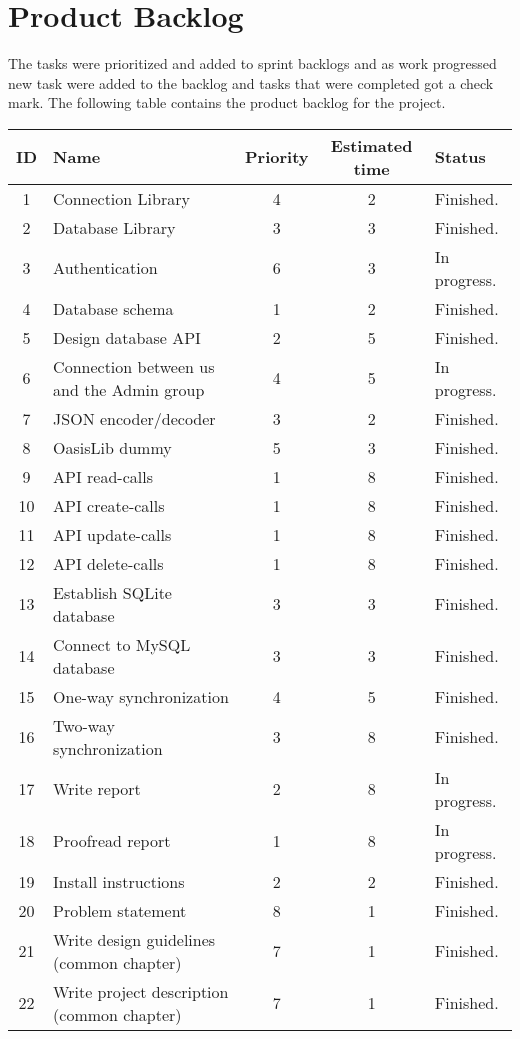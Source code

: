\section{Product Backlog}
The tasks were prioritized and added to sprint backlogs and as work progressed new task were added to the backlog and tasks that were completed got a check mark. The following table contains the product backlog for the project.

\begin{center}
	\begin{tabular}{| c | l | c | c | l |}
	\hline
	\textbf{ID} 	& \textbf{Name} 										& \textbf{Priority} 	& \textbf{Estimated time} 	& \textbf{Status} 			\\ 	\hline
	1 	& Connection Library 						& 4 		& 2 				& Finished. 		\\	\hline
	2 	& Database Library 							& 3 		& 3 				& Finished. 		\\	\hline
	3 	& Authentication 							& 6 		& 3 				& In progress. 		\\ 	\hline
	4 	& Database schema 							& 1 		& 2 				& Finished. 		\\	\hline
	5 	& Design database API 						& 2 		& 5 				& Finished. 		\\	\hline
	6 	& Connection between us and the Admin group & 4 		& 5 				& In progress. 		\\ 	\hline
	7 	& JSON encoder/decoder 						& 3 		& 2 				& Finished. 		\\	\hline
	8 	& OasisLib dummy							& 5 		& 3 				& Finished. 		\\	\hline
	9 	& API read-calls 							& 1 		& 8 				& Finished. 		\\ 	\hline
	10 	& API create-calls 							& 1 		& 8 				& Finished. 		\\	\hline
	11 	& API update-calls 							& 1 		& 8 				& Finished. 		\\	\hline
	12	& API delete-calls							& 1 		& 8 				& Finished. 		\\ 	\hline
	13 	& Establish SQLite database 				& 3 		& 3 				& Finished. 		\\	\hline
	14	& Connect to MySQL database 				& 3 		& 3 				& Finished. 		\\	\hline
	15	& One-way synchronization					& 4 		& 5 				& Finished. 		\\ 	\hline
	16	& Two-way synchronization					& 3 		& 8 				& Finished. 		\\	\hline
	17	& Write report								& 2 		& 8 				& In progress. 		\\	\hline
	18	& Proofread report 							& 1 		& 8 				& In progress. 		\\ 	\hline
	19	& Install instructions 						& 2 		& 2 				& Finished. 		\\	\hline
	20	& Problem statement							& 8 		& 1 				& Finished. 		\\	\hline
	21	& Write	design guidelines (common chapter)	& 7 		& 1 				& Finished. 		\\ 	\hline
	22	& Write	project description (common chapter)& 7 		& 1 				& Finished. 		\\ 	\hline
	\end{tabular}
\end{center}